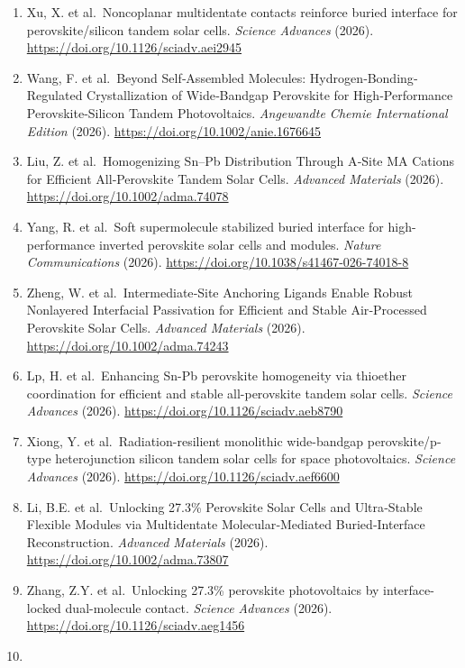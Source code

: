 \documentclass[
  11pt,
]{article}
\providecommand{\tightlist}{%
  \setlength{\itemsep}{0pt}\setlength{\parskip}{0pt}}
\begin{document}
\begin{enumerate}
\def\labelenumi{\arabic{enumi}.}
\tightlist
\item
  Xu, X. et al.~Noncoplanar multidentate contacts reinforce buried
  interface for perovskite/silicon tandem solar cells. \emph{Science
  Advances} (2026). \url{https://doi.org/10.1126/sciadv.aei2945}
\item
  Wang, F. et al.~Beyond Self‐Assembled Molecules:
  Hydrogen‐Bonding‐Regulated Crystallization of Wide‐Bandgap Perovskite
  for High‐Performance Perovskite‐Silicon Tandem Photovoltaics.
  \emph{Angewandte Chemie International Edition} (2026).
  \url{https://doi.org/10.1002/anie.1676645}
\item
  Liu, Z. et al.~Homogenizing Sn--Pb Distribution Through A‐Site MA
  Cations for Efficient All‐Perovskite Tandem Solar Cells.
  \emph{Advanced Materials} (2026).
  \url{https://doi.org/10.1002/adma.74078}
\item
  Yang, R. et al.~Soft supermolecule stabilized buried interface for
  high-performance inverted perovskite solar cells and modules.
  \emph{Nature Communications} (2026).
  \url{https://doi.org/10.1038/s41467-026-74018-8}
\item
  Zheng, W. et al.~Intermediate‐Site Anchoring Ligands Enable Robust
  Nonlayered Interfacial Passivation for Efficient and Stable
  Air‐Processed Perovskite Solar Cells. \emph{Advanced Materials}
  (2026). \url{https://doi.org/10.1002/adma.74243}
\item
  Lp, H. et al.~Enhancing Sn-Pb perovskite homogeneity via thioether
  coordination for efficient and stable all-perovskite tandem solar
  cells. \emph{Science Advances} (2026).
  \url{https://doi.org/10.1126/sciadv.aeb8790}
\item
  Xiong, Y. et al.~Radiation-resilient monolithic wide-bandgap
  perovskite/p-type heterojunction silicon tandem solar cells for space
  photovoltaics. \emph{Science Advances} (2026).
  \url{https://doi.org/10.1126/sciadv.aef6600}
\item
  Li, B.E. et al.~Unlocking 27.3\% Perovskite Solar Cells and
  Ultra‐Stable Flexible Modules via Multidentate Molecular‐Mediated
  Buried‐Interface Reconstruction. \emph{Advanced Materials} (2026).
  \url{https://doi.org/10.1002/adma.73807}
\item
  Zhang, Z.Y. et al.~Unlocking 27.3\% perovskite photovoltaics by
  interface-locked dual-molecule contact. \emph{Science Advances}
  (2026). \url{https://doi.org/10.1126/sciadv.aeg1456}
\item

\end{enumerate}
\end{document}
